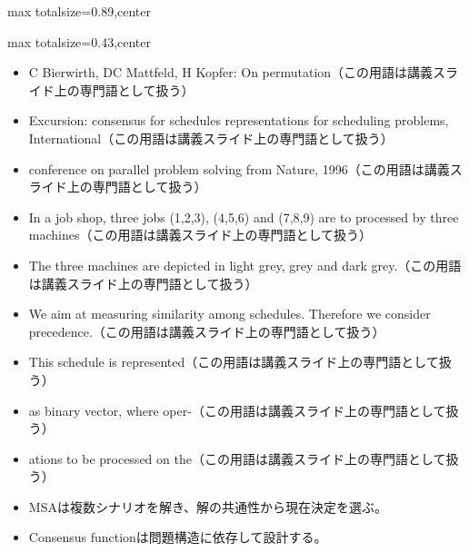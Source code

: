 \begin{minipage}[t]{0.58\textwidth}
\begin{adjustbox}{max totalsize={\textwidth}{0.89\textheight},center}
\begin{minipage}{\textwidth}
\end{minipage}
\end{adjustbox}
\end{minipage}


\clearpage
{}
\begin{minipage}[t]{0.405\textwidth}
\begin{adjustbox}{max totalsize={\textwidth}{0.43\textheight},center}
\begin{minipage}{\textwidth}\scriptsize
{}\begin{itemize}
\item C Bierwirth, DC Mattfeld, H Kopfer: On permutation（この用語は講義スライド上の専門語として扱う）
\item Excursion: consensus for schedules representations for scheduling problems, International（この用語は講義スライド上の専門語として扱う）
\item conference on parallel problem solving from Nature, 1996（この用語は講義スライド上の専門語として扱う）
\item In a job shop, three jobs (1,2,3), (4,5,6) and (7,8,9) are to processed by three machines（この用語は講義スライド上の専門語として扱う）
\item The three machines are depicted in light grey, grey and dark grey.（この用語は講義スライド上の専門語として扱う）
\item We aim at measuring similarity among schedules. Therefore we consider precedence.（この用語は講義スライド上の専門語として扱う）
\item This schedule is represented（この用語は講義スライド上の専門語として扱う）
\item as binary vector, where oper-（この用語は講義スライド上の専門語として扱う）
\item ations to be processed on the（この用語は講義スライド上の専門語として扱う）
\end{itemize}\begin{itemize}
\item MSAは複数シナリオを解き、解の共通性から現在決定を選ぶ。
\item Consensus functionは問題構造に依存して設計する。
\end{itemize}
\end{minipage}
\end{adjustbox}
\end{minipage}\hfill
